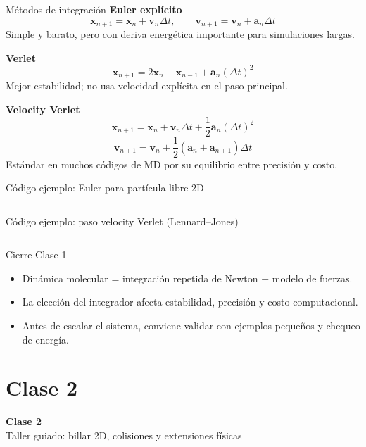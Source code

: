 \begin{frame}{Métodos de integración}
\small
\textbf{Euler explícito}
\[
\bm{x}_{n+1}=\bm{x}_n+\bm{v}_n\Delta t,\qquad
\bm{v}_{n+1}=\bm{v}_n+\bm{a}_n\Delta t
\]
Simple y barato, pero con deriva energética importante para simulaciones largas.

\vspace{0.2cm}
\textbf{Verlet}
\[
\bm{x}_{n+1}=2\bm{x}_n-\bm{x}_{n-1}+\bm{a}_n(\Delta t)^2
\]
Mejor estabilidad; no usa velocidad explícita en el paso principal.

\vspace{0.2cm}
\textbf{Velocity Verlet}
\[
\bm{x}_{n+1}=\bm{x}_n+\bm{v}_n\Delta t+\frac12\bm{a}_n(\Delta t)^2
\]
\[
\bm{v}_{n+1}=\bm{v}_n+\frac12(\bm{a}_n+\bm{a}_{n+1})\Delta t
\]
Estándar en muchos códigos de MD por su equilibrio entre precisión y costo.
\end{frame}

\begin{frame}[fragile]{Código ejemplo: Euler para partícula libre 2D}
\inputminted{python}{md_euler.py}
\end{frame}

\begin{frame}[fragile]{Código ejemplo: paso velocity Verlet (Lennard--Jones)}
\inputminted[firstline=1,lastline=55]{python}{md_velocity_verlet.py}
\end{frame}

\begin{frame}{Cierre Clase 1}
\begin{itemize}
    \item Dinámica molecular = integración repetida de Newton + modelo de fuerzas.
    \item La elección del integrador afecta estabilidad, precisión y costo computacional.
    \item Antes de escalar el sistema, conviene validar con ejemplos pequeños y chequeo de energía.
\end{itemize}
\end{frame}

\section{Clase 2}

\begin{frame}[plain]
\centering
\vfill
{\Huge \bfseries Clase 2}\\[0.4cm]
{\Large Taller guiado: billar 2D, colisiones y extensiones físicas}
\vfill
\end{frame}

